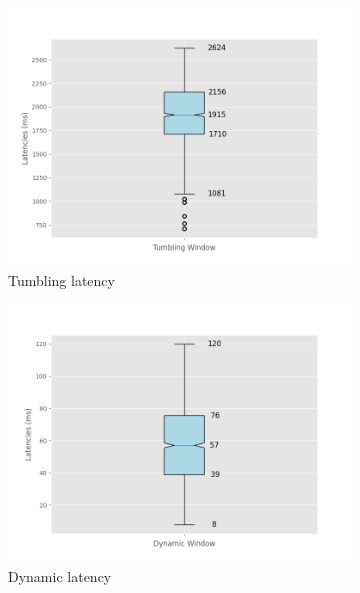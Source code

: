 \begin{figure}[htbp]
\begin{subfigure}[b]{0.5\columnwidth}
        \includegraphics[width=\columnwidth]{fig/constant-rate/TumblingWindow_latency_boxplot.png}
        \caption{Tumbling latency}
        \label{fig:constant_tumb_boxplot}
    \end{subfigure}
    \begin{subfigure}[b]{0.5\columnwidth}
        \includegraphics[width=\columnwidth]{fig/constant-rate/DynamicWindow_latency_boxplot.png}
        \caption{Dynamic latency}
        \label{fig:constant_dynamic_boxplot}
    \end{subfigure}
    \\
    \begin{subfigure}[b]{\columnwidth}
        \centering

\end{subfigure}
\end{figure}
